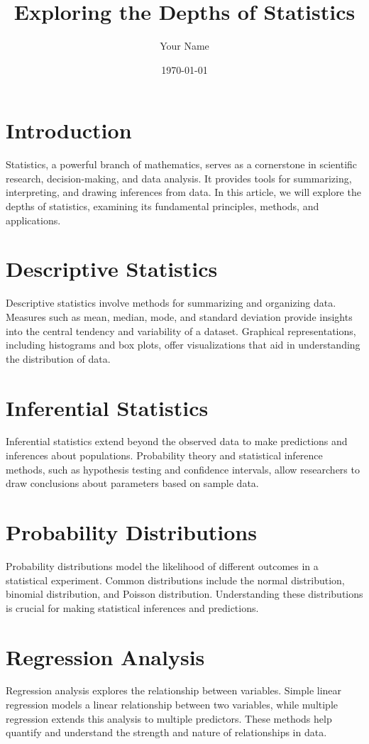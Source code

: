 \documentclass{article}
\title{Exploring the Depths of Statistics}
\author{Your Name}
\date{\today}
\begin{document}
\maketitle

\section*{Introduction}
Statistics, a powerful branch of mathematics, serves as a cornerstone in scientific research, decision-making, and data analysis. It provides tools for summarizing, interpreting, and drawing inferences from data. In this article, we will explore the depths of statistics, examining its fundamental principles, methods, and applications.

\section*{Descriptive Statistics}
Descriptive statistics involve methods for summarizing and organizing data. Measures such as mean, median, mode, and standard deviation provide insights into the central tendency and variability of a dataset. Graphical representations, including histograms and box plots, offer visualizations that aid in understanding the distribution of data.

\section*{Inferential Statistics}
Inferential statistics extend beyond the observed data to make predictions and inferences about populations. Probability theory and statistical inference methods, such as hypothesis testing and confidence intervals, allow researchers to draw conclusions about parameters based on sample data.

\section*{Probability Distributions}
Probability distributions model the likelihood of different outcomes in a statistical experiment. Common distributions include the normal distribution, binomial distribution, and Poisson distribution. Understanding these distributions is crucial for making statistical inferences and predictions.

\section*{Regression Analysis}
Regression analysis explores the relationship between variables. Simple linear regression models a linear relationship between two variables, while multiple regression extends this analysis to multiple predictors. These methods help quantify and understand the strength and nature of relationships in data.
\end{document}
